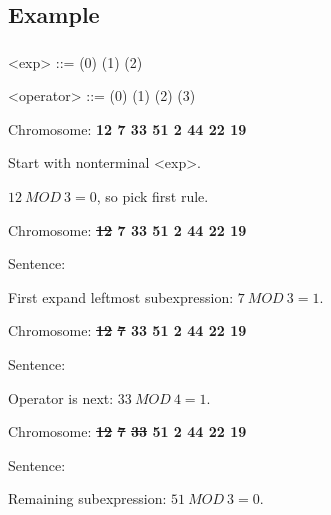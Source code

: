 \documentclass{beamer}
\makeatletter
\newcommand*{\currentname}{\@currentlabelname}
\makeatother
\begin{document}
\subsection{Example}
\begin{frame}
\frametitle{\currentname}
\begin{grammar}
<exp>      ::=       \hfill (0) \hspace{1em}
            \alt {}    					  		\hfill (1) \hspace{1em}
            \alt {}      					  		\hfill (2) \hspace{1em}

<operator> ::=   \lit*{+} 						  		\hfill (0) \hspace{1em}
		    \alt \lit*{-} 						  		\hfill (1) \hspace{1em}
		    \alt \lit*{*} 						  		\hfill (2) \hspace{1em}
		    \alt \lit*{/} 						 		\hfill (3) \hspace{1em}

\end{grammar}

\begin{itemize}

	{	
		\item Chromosome: \textbf{12 7 33 51 2 44 22 19}
		\item Start with nonterminal <exp>.
		\item $12\ MOD\ 3 = 0$, so pick first rule.
	}

	{	
		\item Chromosome: \textbf{\sout{12} 7 33 51 2 44 22 19}
		\item Sentence:   
		\item First expand leftmost subexpression: $7\ MOD\ 3 = 1$.
	}

	{		
		\item Chromosome: \textbf{\sout{12} \sout{7} 33 51 2 44 22 19}
		\item Sentence:   
		\item Operator is next: $33\ MOD\ 4 = 1$.
	}

	{		
		\item Chromosome: \textbf{\sout{12} \sout{7} \sout{33} 51 2 44 22 19}
		\item Sentence:  \lit*{-} 
		\item Remaining subexpression: $51\ MOD\ 3 = 0$.
	}


\end{itemize}
\end{frame}
\end{document}
